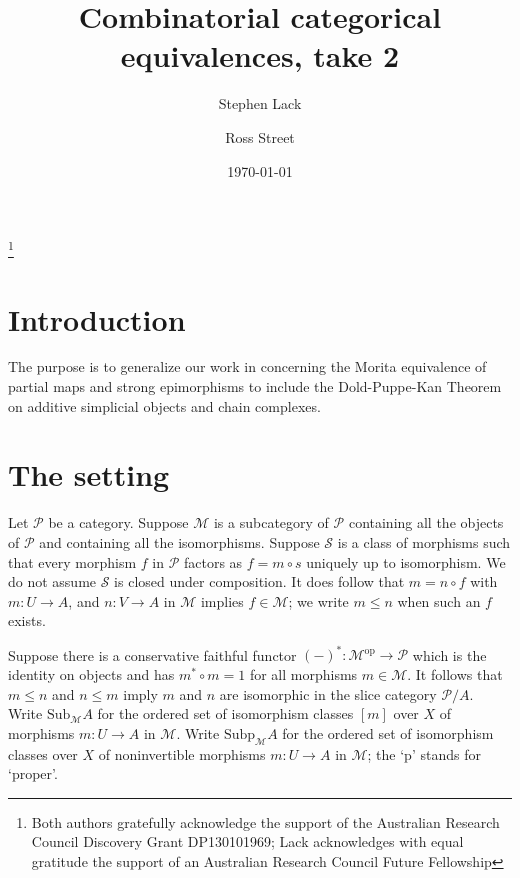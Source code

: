 \documentclass[a4paper,12pt,reqno]{amsart}
\theoremstyle{definition}
\theoremstyle{fact}
\theoremstyle{genquest}
\theoremstyle{step}
\newcommand{\lra}{\longrightarrow}
\newcommand{\ra}{\rightarrow}
\def\CM{{\mathscr M}}
\def\CP{{\mathscr P}}
\def\CS{{\mathscr S}}
\begin{document}
\title{Combinatorial categorical equivalences, take 2}

\author{Stephen Lack}
\address{Department of Mathematics, Macquarie University, NSW 2109, Australia}

\author{Ross Street}
\address{Department of Mathematics, Macquarie University, NSW 2109, Australia}

\thanks{Both authors gratefully acknowledge the support of the Australian Research Council Discovery Grant DP130101969; Lack acknowledges with equal gratitude the support of an Australian Research Council Future Fellowship}

\date{\today}
\maketitle

\tableofcontents

\section{Introduction}

The purpose is to generalize our work in \cite{PMSE} concerning 
the Morita equivalence of partial maps and strong epimorphisms
to include the Dold-Puppe-Kan Theorem \cite{Dold, DoldPuppe, Kan} 
on additive simplicial objects and chain complexes. 

\section{The setting}\label{setting}

Let $\CP$ be a category. 
Suppose $\CM$ is a subcategory of $\CP$ containing all the objects of $\CP$ and containing all the isomorphisms.
Suppose $\CS$ is a class of morphisms such that every morphism $f$ in $\CP$ factors as $f=m\circ s$
uniquely up to isomorphism. We do not assume $\CS$ is closed under composition.
It does follow that $m=n\circ f$ with $m:U\ra A$, and $n:V\ra A$ in $\CM$ implies $f\in \CM$;
we write $m\le n$ when such an $f$ exists.

Suppose there is a conservative faithful functor $(-)^*: \CM^{\mathrm{op}} \lra \CP$ which is
the identity on objects and has $m^*\circ m=1$ for all morphisms $m\in \CM$. 
It follows that $m\le n$ and $n\le m$ imply $m$ and $n$ are isomorphic in the slice category $\CP/A$. 
Write $\mathrm{Sub}_{\CM}A$ for the ordered set of isomorphism classes $[m]$ over $X$ of
morphisms $m:U\ra A$ in $\CM$. 
Write $\mathrm{Subp}_{\CM}A$ for the ordered set of isomorphism classes over $X$ of
noninvertible morphisms $m:U\ra A$ in $\CM$; the `p' stands for `proper'.
\end{document}
